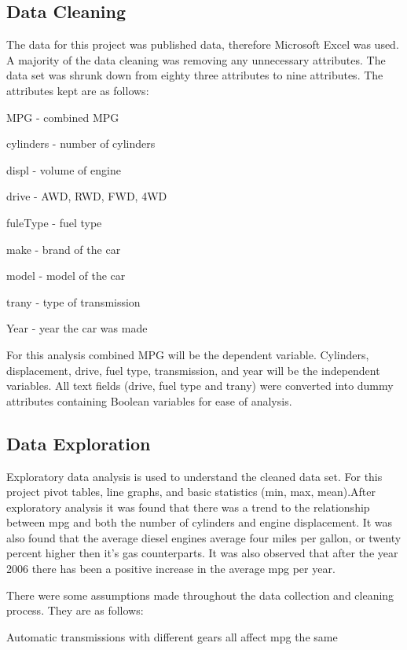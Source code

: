 \documentclass[runningheads]{llncs}
\begin{document}
\subsection{Data Cleaning}

The data for this project was published data, therefore Microsoft Excel was used. A majority of the data cleaning  was removing any unnecessary attributes. The data set was shrunk down from eighty three attributes to nine attributes. The attributes kept are as follows: 


\hfill


MPG - combined MPG

cylinders - number of cylinders

displ - volume of engine

drive - AWD, RWD, FWD, 4WD

fuleType - fuel type

make - brand of the car

model - model of the car

trany - type of transmission

Year - year the car was made

\hfill

For this analysis combined MPG will be the dependent variable. Cylinders, displacement, drive, fuel type, transmission, and year will be the independent variables. All text fields (drive, fuel type and trany) were converted into dummy attributes containing Boolean variables for ease of analysis.

\subsection{Data Exploration}

Exploratory data analysis is used to understand the cleaned data set. For this project pivot tables, line graphs, and basic statistics (min, max, mean).After exploratory analysis it was found that there was a trend to the relationship between mpg and both the number of cylinders and engine displacement. It was also found that the average diesel engines average four miles per gallon, or twenty percent higher then it's gas counterparts. It was also observed that after the year 2006 there has been a positive increase in the average mpg per year.

There were some assumptions made throughout the data collection and cleaning process. 
They are as follows:

\hfill

Automatic transmissions with different gears all affect mpg the same
\end{document}
